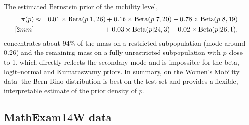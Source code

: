 \vkL
The estimated Bernstein prior of the mobility level, 
\begin{eqnarray*}
    \pi(p) &\approx& 0.01 \times \mbox{Beta}(p | 1, 26) + 0.16 \times \mbox{Beta}(p | 7, 20) + 0.78 \times \mbox{Beta}(p | 8, 19) \\ [2mm]
    && +\; 0.03 \times \mbox{Beta}(p | 24, 3)  + 0.02 \times \mbox{Beta}(p | 26, 1), 
\end{eqnarray*}
concentrates about 94\% of the mass on a restricted subpopulation (mode around 0.26) and the remaining mass on a fully unrestricted subpopulation with $p$ close to 1, which directly reflects the secondary mode and is impossible for the beta, logit–normal and Kumaraswamy priors. In summary, on the Women’s Mobility data, the Bern-Bino distribution is best on the test set and provides a flexible, interpretable estimate of the prior density of $p$.

\subsection{MathExam14W data}       %

\cite{ZUL2014} 